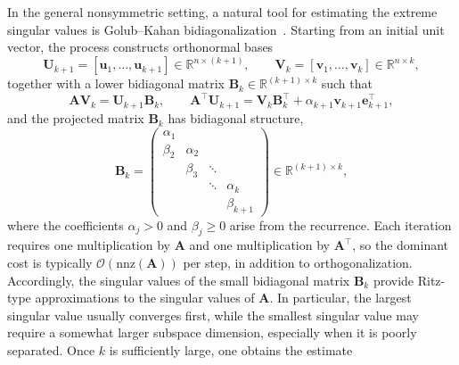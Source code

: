 \documentclass[11pt,a4paper]{article}
\theoremstyle{plain}
\theoremstyle{definition}
\theoremstyle{remark}
\begin{document}
In the general nonsymmetric setting, a natural tool for estimating the extreme singular values is Golub--Kahan bidiagonalization~\cite{golub2013matrix}. Starting from an initial unit vector, the process constructs orthonormal bases
\begin{equation*}
\mathbf{U}_{k+1} = [\mathbf{u}_1,\dots,\mathbf{u}_{k+1}] \in \mathbb{R}^{n \times (k+1)},
\qquad
\mathbf{V}_{k} = [\mathbf{v}_1,\dots,\mathbf{v}_{k}] \in \mathbb{R}^{n \times k},
\end{equation*}
together with a lower bidiagonal matrix $\mathbf{B}_k \in \mathbb{R}^{(k+1)\times k}$ such that%
\begin{equation}
\mathbf{A}\mathbf{V}_k = \mathbf{U}_{k+1}\mathbf{B}_k,
\qquad
\mathbf{A}^\top \mathbf{U}_{k+1}
= \mathbf{V}_k \mathbf{B}_k^\top + \alpha_{k+1}\mathbf{v}_{k+1}\mathbf{e}_{k+1}^\top, 
\label{eq:gk_relation}
\end{equation}
and the projected matrix $\mathbf{B}_k$ has bidiagonal structure,
\begin{equation}
\mathbf{B}_k =
\begin{pmatrix}
\alpha_1 &        &        &        \\
\beta_2  & \alpha_2 &      &        \\
         & \beta_3  & \ddots &      \\
         &          & \ddots & \alpha_k \\
         &          &        & \beta_{k+1}
\end{pmatrix}
\in \mathbb{R}^{(k+1)\times k},
\end{equation}
where the coefficients $\alpha_j > 0$ and $\beta_j \ge 0$ arise from the recurrence. Each iteration requires one multiplication by $\mathbf{A}$ and one multiplication by $\mathbf{A}^\top$, so the dominant cost is typically $\mathcal{O}(\mathrm{nnz}(\mathbf{A}))$ per step, in addition to orthogonalization. Accordingly, the singular values of the small bidiagonal matrix $\mathbf{B}_k$ provide Ritz-type approximations to the singular values of $\mathbf{A}$. In particular, the largest singular value usually converges first, while the smallest singular value may require a somewhat larger subspace dimension, especially when it is poorly separated. Once $k$ is sufficiently large, one obtains the estimate
\end{document}
